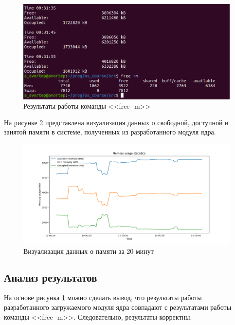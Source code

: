 \begin{figure}[h!]
	\begin{center}
		\includegraphics[scale=0.45]{jpg/3.png}
	\end{center}
	\captionsetup{justification=centering}
	\caption{Результаты работы команды <<free -m>>}
	\label{fig:free-m}
\end{figure}

На рисунке \ref{fig:graphic} представлена визуализация данных о свободной, доступной и занятой памяти в системе, полученных из разработанного модуля ядра.

\begin{figure}[h!]
	\begin{center}
		\includegraphics[scale=0.55]{jpg/memory_usage.png}
	\end{center}
	\captionsetup{justification=centering}
	\caption{Визуализация данных о памяти за 20 минут}
	\label{fig:graphic}
\end{figure}

\newpage

\subsection{Анализ результатов}

На основе рисунка \ref{fig:free-m} можно сделать вывод, что результаты работы разработанного загружаемого модуля ядра совпадают с результатами работы команды <<free -m>>. Следовательно, результаты корректны.

